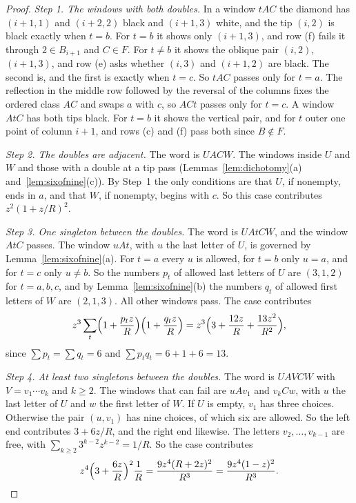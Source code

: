 \begin{proof}
\emph{Step 1. The windows with both doubles.} In a window $tAC$ the diamond has $(i+1,1)$ and
$(i+2,2)$ black and $(i+1,3)$ white, and the tip $(i,2)$ is black exactly when $t=b$. For
$t=b$ it shows only $(i+1,3)$, and row (f) fails it through $2\in B_{i+1}$ and $C\in F$. For
$t\ne b$ it shows the oblique pair $(i,2)$, $(i+1,3)$, and row (e) asks whether $(i,3)$ and
$(i+1,2)$ are black. The second is, and the first is exactly when $t=c$. So $tAC$ passes only
for $t=a$. The reflection in the middle row followed by the reversal of the columns fixes the
ordered class $AC$ and swaps $a$ with $c$, so $ACt$ passes only for $t=c$. A window $AtC$ has
both tips black. For $t=b$ it shows the vertical pair, and for $t$ outer one point of column
$i+1$, and rows (c) and (f) pass both since $B\notin F$.

\emph{Step 2. The doubles are adjacent.} The word is $UACW$. The windows inside $U$ and $W$
and those with a double at a tip pass (Lemmas~\ref{lem:dichotomy}(a)
and~\ref{lem:sixofnine}(c)). By Step~1 the only conditions are that $U$, if nonempty, ends in
$a$, and that $W$, if nonempty, begins with $c$. So this case contributes $z^2(1+z/R)^2$.

\emph{Step 3. One singleton between the doubles.} The word is $UAtCW$, and the window $AtC$
passes. The window $uAt$, with $u$ the last letter of $U$, is governed by
Lemma~\ref{lem:sixofnine}(a). For $t=a$ every $u$ is allowed, for $t=b$ only $u=a$, and for
$t=c$ only $u\ne b$. So the numbers $p_t$ of allowed last letters of $U$ are $(3,1,2)$ for
$t=a,b,c$, and by Lemma~\ref{lem:sixofnine}(b) the numbers $q_t$ of allowed first letters of
$W$ are $(2,1,3)$. All other windows pass. The case contributes
\[
z^3\sum_{t}\Bigl(1+\frac{p_tz}R\Bigr)\Bigl(1+\frac{q_tz}R\Bigr)
=z^3\Bigl(3+\frac{12z}R+\frac{13z^2}{R^2}\Bigr),
\]
since $\sum p_t=\sum q_t=6$ and $\sum p_tq_t=6+1+6=13$.

\emph{Step 4. At least two singletons between the doubles.} The word is $UAVCW$ with
$V=v_1\cdots v_k$ and $k\ge2$. The windows that can fail are $uAv_1$ and $v_kCw$, with $u$
the last letter of $U$ and $w$ the first letter of $W$. If $U$ is empty, $v_1$ has three
choices. Otherwise the pair $(u,v_1)$ has nine choices, of which six are allowed. So the left
end contributes $3+6z/R$, and the right end likewise. The letters $v_2,\dots,v_{k-1}$ are
free, with $\sum_{k\ge2}3^{k-2}z^{k-2}=1/R$. So the case contributes
\[
z^4\Bigl(3+\frac{6z}R\Bigr)^2\frac1R=\frac{9z^4(R+2z)^2}{R^3}=\frac{9z^4(1-z)^2}{R^3}.
\]


\end{proof}
